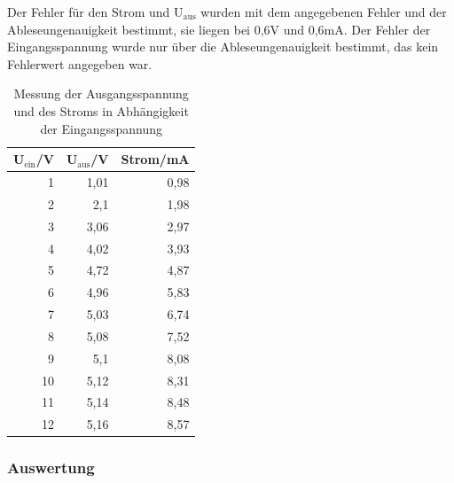 \documentclass[12pt,a4paper]{article}
\begin{document}
Der Fehler für den Strom und U$_\text{aus}$ wurden mit dem angegebenen Fehler und der Ableseungenauigkeit bestimmt, sie liegen bei 0,6V und 0,6mA. Der Fehler der Eingangsspannung wurde nur über die Ableseungenauigkeit bestimmt, das kein Fehlerwert angegeben war.

\begin{table}[htbp]
\caption{Messung der Ausgangsspannung und des Stroms in Abhängigkeit der Eingangsspannung}
\begin{center}
\begin{tabular}{|r|r|r|}
\hline
\multicolumn{1}{|l|}{U$_\text{ein}$/V} & \multicolumn{1}{l|}{U$_\text{aus}$/V} & \multicolumn{1}{l|}{Strom/mA} \\ \hline
1 & 1,01 & 0,98 \\ \hline
2 & 2,1 & 1,98 \\ \hline
3 & 3,06 & 2,97 \\ \hline
4 & 4,02 & 3,93 \\ \hline
5 & 4,72 & 4,87 \\ \hline
6 & 4,96 & 5,83 \\ \hline
7 & 5,03 & 6,74 \\ \hline
8 & 5,08 & 7,52 \\ \hline
9 & 5,1 & 8,08 \\ \hline
10 & 5,12 & 8,31 \\ \hline
11 & 5,14 & 8,48 \\ \hline
12 & 5,16 & 8,57 \\ \hline
\end{tabular}
\end{center}
\label{tab:3_2_w}
\end{table}


\subsubsection{Auswertung}
\end{document}
